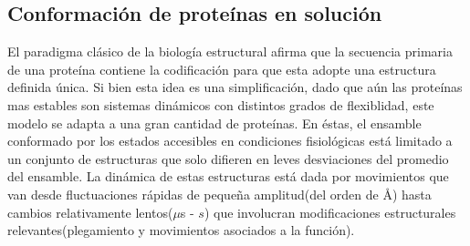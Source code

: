 



































\subsection{Conformación de proteínas en solución} \label{conformationalLandscape}

El paradigma clásico de la biología estructural afirma que la secuencia primaria de una proteína contiene la codificación para que esta adopte una estructura definida única.
Si bien esta idea es una simplificación, dado que aún las proteínas mas estables son sistemas dinámicos con distintos grados de flexiblidad, este modelo se adapta a una gran cantidad de proteínas.
En éstas, el ensamble conformado por los estados accesibles en condiciones fisiológicas está limitado a un conjunto de estructuras que solo difieren en leves desviaciones del promedio del ensamble.
La dinámica de estas estructuras está dada por movimientos que van desde fluctuaciones rápidas de pequeña amplitud(del orden de \AA) hasta cambios relativamente lentos($\mu$s - $s$) que 
involucran modificaciones estructurales relevantes(plegamiento y movimientos asociados a la función).

